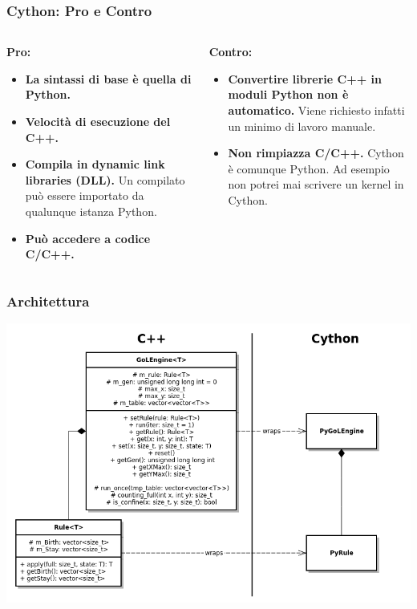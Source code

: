 \documentclass[11pt]{beamer}
\begin{document}
\begin{frame}
\frametitle{Cython: Pro e Contro}
\begin{columns}[T] %
	\pause
	\begin{column}{.48\textwidth}
		\textbf{Pro:}
		\begin{itemize}
			\item \textbf{La sintassi di base è quella di Python.}
			\item \textbf{Velocità di esecuzione del C++.}
			\item \textbf{Compila in dynamic link libraries (DLL).}
			Un compilato può essere importato da qualunque istanza Python.
			\item \textbf{Può accedere a codice C/C++.}
		\end{itemize}
	\end{column}%
	\hfill%
	\begin{column}{.48\textwidth}
		\pause
		\textbf{Contro:}
		\begin{itemize}
			\item \textbf{Convertire librerie C++ in moduli Python non è automatico.}
			Viene richiesto infatti un minimo di lavoro manuale.
			\item \textbf{Non rimpiazza C/C++.}
			Cython è comunque Python. Ad esempio non potrei mai scrivere un kernel in Cython.
		\end{itemize}
	\end{column}
\end{columns}
\end{frame}

\begin{frame}
\frametitle{Architettura}
\centering
\includegraphics[width=0.92\linewidth]{UML1.png}
\end{frame}
\end{document}
